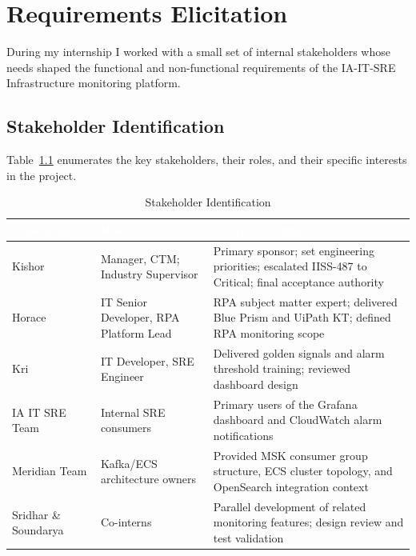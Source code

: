 ﻿%

\chapter{Requirements Elicitation}
\label{chap:requirements}

During my internship I worked with a small set of internal stakeholders
whose needs shaped the functional and non-functional requirements of the
IA-IT-SRE Infrastructure monitoring platform.

\section{Stakeholder Identification}
\label{sec:stakeholders}

Table~\ref{tab:stakeholders} enumerates the key
stakeholders, their roles, and their specific interests in the
project.

\begin{table}[ht]
\centering
\caption{Stakeholder Identification}
\label{tab:stakeholders}
\begin{tabularx}{\textwidth}{p{2.5cm}p{3.8cm}X}
\hline
\rowcolor{smubrand}\textcolor{white}{\textbf{Stakeholder}} & \textcolor{white}{\textbf{Role}} & \textcolor{white}{\textbf{Interest / Influence}} \\
\hline
Kishor & Manager, CTM; Industry Supervisor & Primary sponsor; set engineering priorities; escalated IISS-487 to Critical; final acceptance authority \\
Horace & IT Senior Developer, RPA Platform Lead & RPA subject matter expert; delivered Blue Prism and UiPath KT; defined RPA monitoring scope \\
Kri & IT Developer, SRE Engineer & Delivered golden signals and alarm threshold training; reviewed dashboard design \\
IA IT SRE Team & Internal SRE consumers & Primary users of the Grafana dashboard and CloudWatch alarm notifications \\
Meridian Team & Kafka/ECS architecture owners & Provided MSK consumer group structure, ECS cluster topology, and OpenSearch integration context \\
Sridhar \& Soundarya & Co-interns & Parallel development of related monitoring features; design review and test validation \\
\hline
\end{tabularx}
\end{table}

